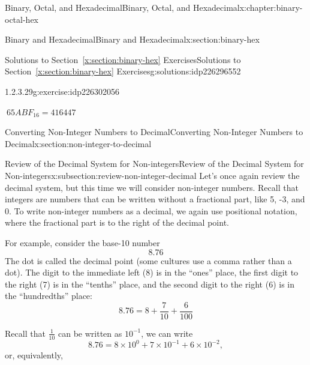 \documentclass[twoside,10pt,]{book}
\newcommand{\xreffont}{\relax}
\numberwithin{equation}{section}
\begin{document}
\begin{chapterptx}{Binary, Octal, and Hexadecimal}{}{Binary, Octal, and Hexadecimal}{}{}{x:chapter:binary-octal-hex}
\begin{sectionptx}{Binary and Hexadecimal}{}{Binary and Hexadecimal}{}{}{x:section:binary-hex}
\begin{solutions-subsection}{Solutions to Section~{\xreffont\ref*{x:section:binary-hex}} Exercises}{}{Solutions to Section~{\xreffont\ref*{x:section:binary-hex}} Exercises}{}{}{g:solutions:idp226296552}
\begin{exercisegroup}
\begin{divisionsolutioneg}{1.2.3.29}{}{g:exercise:idp226302056}%
\par\smallskip%
\noindent\hypertarget{g:solution:idp226294760-main}{}\(\ 65ABF_{16}=416447\)\end{divisionsolutioneg}%
\end{exercisegroup}
\par\medskip\noindent
\end{solutions-subsection}
\end{sectionptx}
%
%
\typeout{************************************************}
\typeout{************************************************}
%
\begin{sectionptx}{Converting Non-Integer Numbers to Decimal}{}{Converting Non-Integer Numbers to Decimal}{}{}{x:section:non-integer-to-decimal}
%
%
\typeout{************************************************}
\typeout{************************************************}
%
\begin{subsectionptx}{Review of the Decimal System for Non-integers}{}{Review of the Decimal System for Non-integers}{}{}{x:subsection:review-non-integer-decimal}
Let's once again review the decimal system, but this time we will consider non-integer numbers.  Recall that integers are numbers that can be written without a fractional part, like 5, -3, and 0.  To write non-integer numbers as a decimal, we again use positional notation, where the fractional part is to the right of the decimal point.%
\par
For example, consider the base-10 number%
\begin{equation*}
8.76
\end{equation*}
The dot is called the decimal point (some cultures use a comma rather than a dot).  The digit to the immediate left (8) is in the ``ones'' place, the first digit to the right (7) is in the ``tenths'' place, and the second digit to the right (6) is in the ``hundredths'' place:%
\begin{equation*}
8.76=8+\frac{7}{10}+\frac{6}{100}
\end{equation*}
%
\par
Recall that \(\tfrac{1}{10}\) can be written as \(10^{-1}\), we can write%
\begin{equation*}
8.76=8\times10^0+7\times10^{-1}+6\times10^{-2},
\end{equation*}
or, equivalently,%
\begin{equation*}

\end{equation*}
\end{subsectionptx}
\end{sectionptx}
\end{chapterptx}
\end{document}
